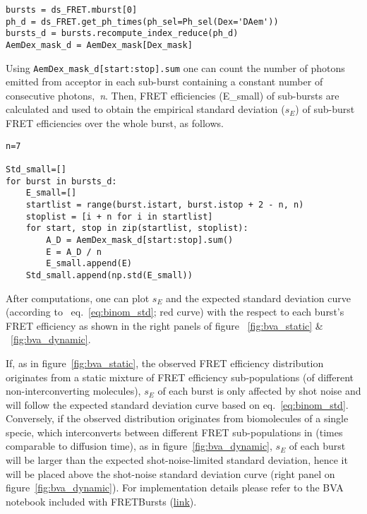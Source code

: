 \begin{lstlisting}
bursts = ds_FRET.mburst[0]
ph_d = ds_FRET.get_ph_times(ph_sel=Ph_sel(Dex='DAem'))
bursts_d = bursts.recompute_index_reduce(ph_d)
AemDex_mask_d = AemDex_mask[Dex_mask]
\end{lstlisting}

Using \verb|AemDex_mask_d[start:stop].sum| one can count the number of photons emitted from acceptor in each sub-burst containing a constant number of consecutive photons,~\textit{n}. Then, FRET efficiencies (E_small) of sub-bursts are calculated and used to obtain the empirical standard deviation ($s_E$) of sub-burst FRET efficiencies over the whole burst, as follows. 

\begin{lstlisting}
n=7

Std_small=[]
for burst in bursts_d:
    E_small=[]
    startlist = range(burst.istart, burst.istop + 2 - n, n)
    stoplist = [i + n for i in startlist]
    for start, stop in zip(startlist, stoplist): 
        A_D = AemDex_mask_d[start:stop].sum()
        E = A_D / n
        E_small.append(E)
    Std_small.append(np.std(E_small))
\end{lstlisting}

After computations, one can plot $s_E$ and the expected standard deviation curve (according to~ eq.~\ref{eq:binom_std}; red curve) with the respect to each burst's FRET efficiency as shown in the right panels of figure ~\ref{fig:bva_static} & ~\ref{fig:bva_dynamic}.



If, as in figure~\ref{fig:bva_static}, the observed FRET efficiency distribution 
originates from a static mixture of FRET efficiency sub-populations (of different 
non-interconverting molecules), 
$s_E$ of each burst is only affected by shot noise and will follow the expected standard deviation curve based on eq.~\ref{eq:binom_std}. 
Conversely, if the observed distribution originates from biomolecules of a single specie, which 
interconverts between different FRET sub-populations in (times comparable to diffusion 
time), as in figure~\ref{fig:bva_dynamic}, $s_E$ of each burst will be larger than the expected 
shot-noise-limited standard deviation, hence it will be placed above the shot-noise standard 
deviation curve (right panel on figure~\ref{fig:bva_dynamic}).
For implementation details please refer to the BVA notebook included with FRETBursts
(\href{http://nbviewer.jupyter.org/github/tritemio/FRETBursts_notebooks/blob/master/notebooks/Example%20-%20Burst%20Variance%20Analysis.ipynb}{link}).
